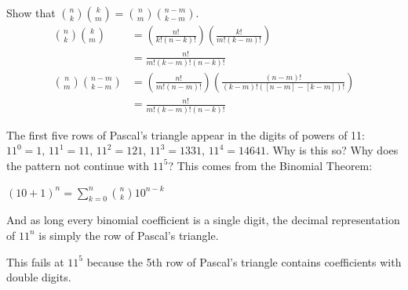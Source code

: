 \documentclass[DIN, pagenumber=false, fontsize=11pt, parskip=half]{scrartcl}
\begin{document}
\begin{problems}
    \problem Show that ${n \choose k} {k \choose m} = {n \choose m} {n-m \choose k-m}$.
    \answer 
    \begin{align}
        \nonumber {n \choose k}{k \choose m} & = \left(\frac{n!}{k!(n-k)!}\right) \left(\frac{k!}{m!(k-m)!}\right)\\ 
        \nonumber & = \frac{n!}{m!(k-m)!(n-k)!}\\ 
        \nonumber {n \choose m}{n-m \choose k-m} & = \left(\frac{n!}{m!(n-m)!}\right) \left(\frac{(n-m)!}{(k-m)!([n-m]-[k-m])!}\right)\\ 
        \nonumber & = \frac{n!}{m!(k-m)!(n-k)!}
    \end{align}


    \problem The first five rows of Pascal's triangle appear in the digits of powers of 11: $11^0 = 1$, $11^1 = 11$, $11^2 = 121$, $11^3 = 1331$, $11^4 = 14641$. Why is this so? Why does the pattern not continue with $11^5$?
    \answer This comes from the Binomial Theorem:

    $(10 + 1)^n = \sum_{k=0}^{n}{n \choose k}10^{n-k}$

    And as long every binomial coefficient is a single digit, the decimal representation of $11^n$ is simply the row of Pascal's triangle.

    This fails at $11^5$ because the 5th row of Pascal's triangle contains coefficients with double digits.
\end{problems}
\end{document}
